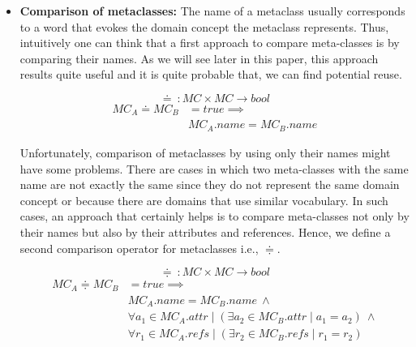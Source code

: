 \begin{itemize}
\item \textbf{Comparison of metaclasses:} The name of a metaclass usually corresponds to a word that evokes the domain concept the metaclass represents. Thus, intuitively one can think that a first approach to compare meta-classes is by comparing their names. As we will see later in this paper, this approach results quite useful and it is quite probable that, we can find potential reuse.

\begin{equation}
  \doteq~: MC \times MC \rightarrow bool
\end{equation}
\vspace{-1mm}
\begin{equation}
\begin{split}
  MC_{A} \doteq MC_{B} &= true \implies \\
   & MC_{A}.name = MC_{B}.name
 \end{split}
\end{equation}

\vspace{2mm}
\hspace{3mm} Unfortunately, comparison of metaclasses by using only their names might have some problems. There are cases in which two meta-classes with the same name are not exactly the same since they do not represent the same domain concept or because there are domains that use similar vocabulary. In such cases, an approach that certainly helps is to compare meta-classes not only by their names but also by their attributes and references. Hence, we define a second comparison operator for metaclasses i.e., $\doteqdot $.

\begin{equation}
  \doteqdot~: MC \times MC \rightarrow bool
\end{equation}
\vspace{-1mm}
\begin{equation}
\begin{split}
  MC_{A} \doteqdot MC_{B} &= true \implies \\
   & MC_{A}.name = MC_{B}.name ~ \wedge \\
   & \forall a_1 \in MC_{A}.attr \mid (\exists a_2 \in MC_{B}.attr \mid a_1 = a_2) ~ \wedge \\
   & \forall r_1 \in MC_{A}.refs \mid (\exists r_2 \in MC_{B}.refs \mid r_1 = r_2)
  \end{split}
\end{equation}




\end{itemize}
